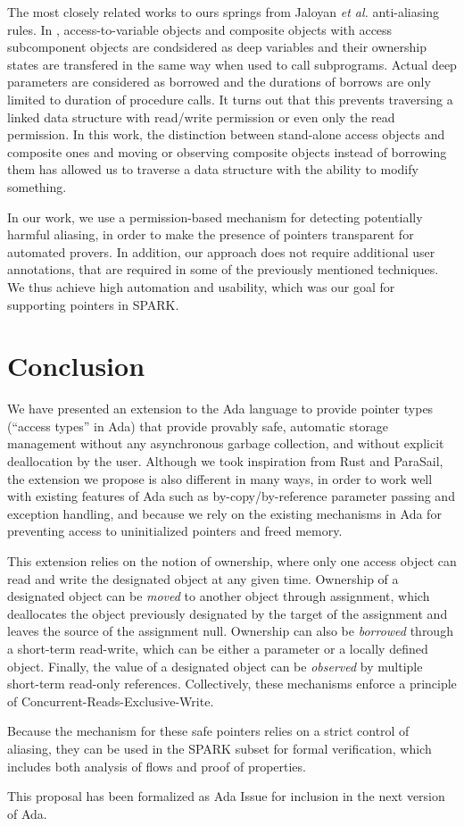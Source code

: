 \documentclass{llncs}
\begin{document}
The most closely related works to ours springs from Jaloyan \textit{et al.} \cite{Jaloyan18} anti-aliasing rules. In \cite{Jaloyan18}, access-to-variable objects
and composite objects with access subcomponent objects are condsidered as deep variables and their ownership states are transfered in the same way when used to call subprograms.
Actual deep parameters are considered as borrowed and the durations of borrows are only limited to duration of procedure calls.   
It turns out that this prevents traversing a linked data structure with read/write permission or even only the read permission. In this work, the distinction between stand-alone access
objects and composite ones and moving or observing composite objects instead of borrowing them has allowed us to traverse a data structure with the ability to modify something. 

In our work, we use a permission-based mechanism for detecting potentially harmful aliasing, in order to make the presence of pointers transparent for automated provers.
In addition, our approach does not require additional user annotations, that are required in some of the previously mentioned techniques. We thus achieve high automation
and usability, which was our goal for supporting pointers in SPARK.


\section{Conclusion}
We have presented an extension to the Ada language to provide pointer types (``access types'' in Ada) that provide provably safe, automatic
storage management without any asynchronous garbage collection, and without explicit deallocation by the user. Although we took inspiration
from Rust and ParaSail, the extension we propose is also different in many ways, in order to work well with existing features of Ada such
as by-copy/by-reference parameter passing and exception handling, and because we rely on the existing mechanisms in Ada for preventing access
to uninitialized pointers and freed memory. 

This extension relies on the notion of ownership, where only one access object can read and write the designated object at any given time.
Ownership of a designated object can be \textit{moved} to another object through assignment, which deallocates the object previously designated
by the target of the assignment and leaves the source of the assignment null. Ownership can also be \textit{borrowed} through a short-term read-write,
which can be either a parameter or a locally defined object. Finally, the value of a designated object can be \textit{observed} by multiple short-term
read-only references. Collectively, these mechanisms enforce a principle of Concurrent-Reads-Exclusive-Write.

Because the mechanism for these safe pointers relies on a strict control of aliasing, they can be used in the SPARK subset for formal verification, which
includes both analysis of flows and proof of properties. 

This proposal has been formalized as Ada Issue \cite{AI2017} for inclusion in the next version of Ada.

\printbibliography[title={References}]
\end{document}

